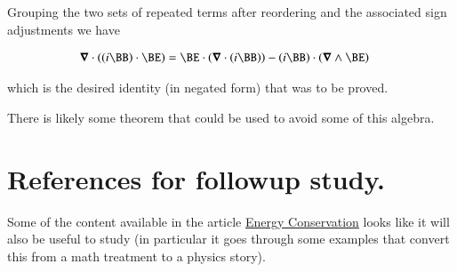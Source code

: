 Grouping the two sets of repeated terms after reordering and the associated sign adjustments we have

\begin{align}\label{eqn:poynting:poyntingDivergence}
\spacegrad \cdot ((i \BB) \cdot \BE) &= \BE \cdot (\spacegrad \cdot (i \BB)) - (i \BB) \cdot (\spacegrad \wedge \BE)
\end{align}

which is the desired identity (in negated form) that was to be proved.

There is likely some theorem that could be used to avoid some of this algebra.

\section{References for followup study. }

Some of the content available in the 
article \href{http://farside.ph.utexas.edu/teaching/em/lectures/node89.html}{Energy Conservation} looks like it will also be useful to study (in particular
it goes through some examples that convert this from a math treatment to
a physics story).
